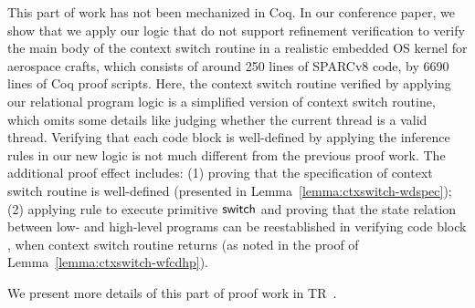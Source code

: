 This part of work has not been mechanized in Coq. 
In our conference paper, we show that 
we apply our logic that do not support 
refinement verification to verify 
the main body of the context switch routine in 
a realistic embedded OS kernel for aerospace crafts, 
which consists of around 250 lines of SPARCv8 code, 
by 6690 lines of Coq proof scripts. Here, the 
context switch routine verified by applying our 
relational program logic is a 
simplified version of context switch routine, 
which omits some details like judging whether the 
current thread is a valid thread. 
Verifying that each code block is well-defined 
by applying the inference rules in our new logic is 
not much different from the previous proof work. 
The additional proof effect includes: 
(1) proving that the specification of context 
switch routine is well-defined (presented in 
Lemma~\ref{lemma:ctxswitch-wdspec}); 
(2) applying  rule to execute 
primitive $\mathsf{switch}$ and proving that the state 
relation between low- and high-level programs 
can be reestablished in verifying code block 
\SwitchNewTask{}, when context switch routine 
returns (as noted in the proof of 
Lemma~\ref{lemma:ctxswitch-wfcdhp}). 

We present more details of this part of proof 
work in TR~\cite{coqimp}.